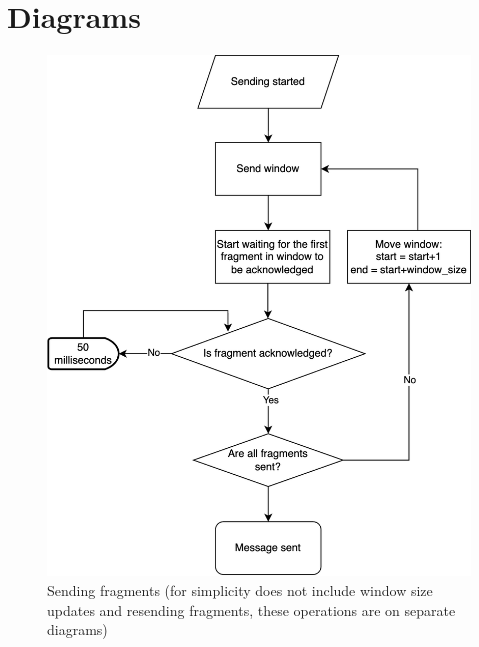 \documentclass{article}
\begin{document}
\section{Diagrams}
\begin{figure}[!h]
    \centering
    \includegraphics[width=\textwidth]{images/sendingp.png}
    \caption{Sending fragments (for simplicity does not include window size updates and resending fragments, these operations are on separate diagrams)}
    \label{fig:mesh1}
\end{figure}
\end{document}
